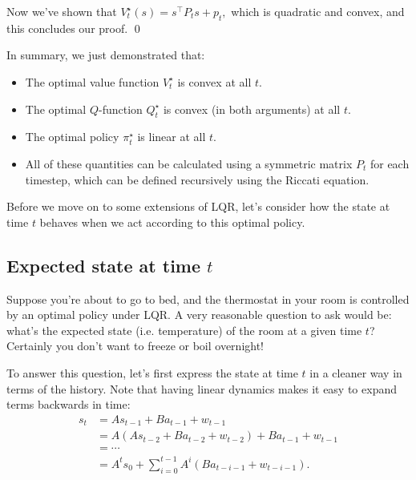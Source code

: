 \documentclass[../main/main]{subfiles}
\begin{document}
Now we've shown that $V^\star_t(s) = s^\top P_t s + p_t,$ which is quadratic and convex, and this concludes our proof. \qed

In summary, we just demonstrated that:

\begin{itemize}
    \item The optimal value function $V^\star_t$ is convex at all $t$.
    \item The optimal $Q$-function $Q^\star_t$ is convex (in both arguments) at all $t$.
    \item The optimal policy $\pi^\star_t$ is linear at all $t$.
    \item All of these quantities can be calculated using a symmetric matrix $P_t$ for each timestep, which can be defined recursively using the Riccati equation.
\end{itemize}

Before we move on to some extensions of LQR, let's consider how the state at time $t$ behaves when we act according to this optimal policy.

\subsection{Expected state at time $t$}


Suppose you're about to go to bed, and the thermostat in your room is controlled by an optimal policy under LQR. A very reasonable question to ask would be: what's the expected state (i.e. temperature) of the room at a given time $t$? Certainly you don't want to freeze or boil overnight!

To answer this question, let's first express the state at time $t$ in a cleaner way in terms of the history. Note that having linear dynamics makes it easy to expand terms backwards in time:
\begin{align*}
    s_t &= A s_{t-1} + B a_{t-1} + w_{t-1} \\
    &= A (As_{t-2} + B a_{t-2} + w_{t-2}) + B a_{t-1} + w_{t-1} \\
    &= \cdots \\
    &= A^t s_0 + \sum_{i=0}^{t-1} A^i (B a_{t-i-1} + w_{t-i-1}).
\end{align*}
\end{document}
